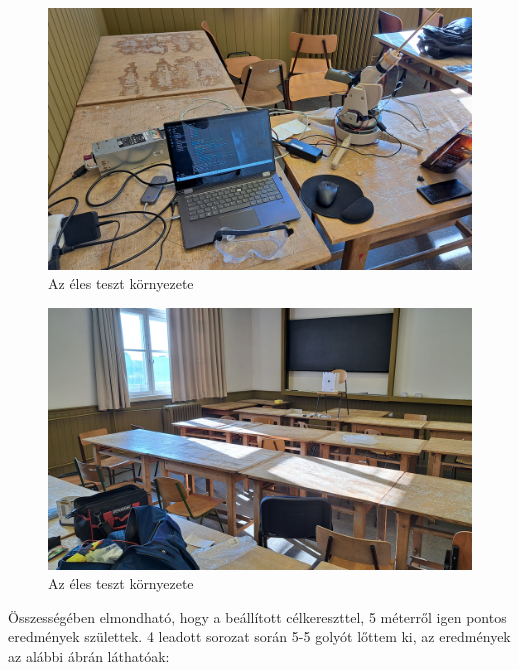 \documentclass[12pt,a4paper]{article}
\begin{document}
\begin{figure}[h!]
	\centering
	\includegraphics[width=0.9\linewidth]{teszt_setup2}
	\caption{Az éles teszt környezete}
	\label{fig:teszt_teszt_setup1}
\end{figure}

\begin{figure}[h!]
	\centering
	\includegraphics[width=0.9\linewidth]{teszt_setup1}
	\caption{Az éles teszt környezete}
	\label{fig:teszt_teszt_setup2}
\end{figure}
\pagebreak
Összességében elmondható, hogy a beállított célkereszttel, 5 méterről igen pontos eredmények születtek. 4 leadott sorozat során 5-5 golyót lőttem ki, az eredmények az alábbi ábrán láthatóak:
\end{document}
